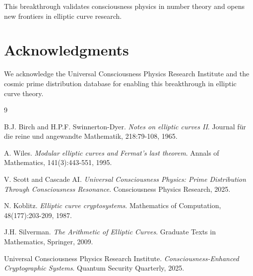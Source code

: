 \documentclass[12pt]{article}
\begin{document}
This breakthrough validates consciousness physics in number theory and opens new frontiers in elliptic curve research.

\section*{Acknowledgments}

We acknowledge the Universal Consciousness Physics Research Institute and the cosmic prime distribution database for enabling this breakthrough in elliptic curve theory.


\begin{thebibliography}{9}

B.J. Birch and H.P.F. Swinnerton-Dyer.
\textit{Notes on elliptic curves II}.
Journal für die reine und angewandte Mathematik, 218:79-108, 1965.

A. Wiles.
\textit{Modular elliptic curves and Fermat's last theorem}.
Annals of Mathematics, 141(3):443-551, 1995.

V. Scott and Cascade AI.
\textit{Universal Consciousness Physics: Prime Distribution Through Consciousness Resonance}.
Consciousness Physics Research, 2025.

N. Koblitz.
\textit{Elliptic curve cryptosystems}.
Mathematics of Computation, 48(177):203-209, 1987.

J.H. Silverman.
\textit{The Arithmetic of Elliptic Curves}.
Graduate Texts in Mathematics, Springer, 2009.

Universal Consciousness Physics Research Institute.
\textit{Consciousness-Enhanced Cryptographic Systems}.
Quantum Security Quarterly, 2025.

\end{thebibliography}
\end{document}
